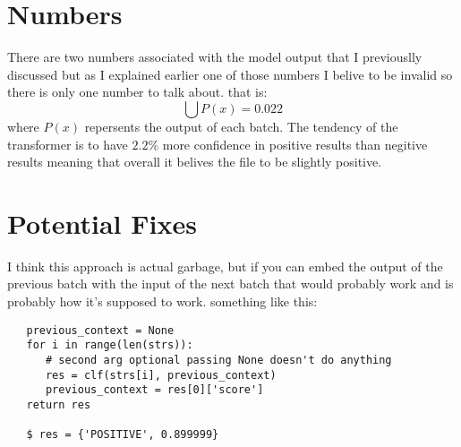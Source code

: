 \documentclass[12pt]{article}
\begin{document}
\newpage
\section{Numbers}
There are two numbers associated with the model output that I previouslly discussed but as I explained
earlier one of those numbers I belive to be invalid so there is only one number to talk about.
that is: $$ \bigcup{P(x)} = 0.022 $$ where $P(x)$ repersents the output of each batch.
The tendency of the transformer is to have $2.2\%$ more confidence in positive results
than negitive results
meaning that overall it belives the file to be slightly positive.

\section{Potential Fixes}
I think this approach is actual garbage, but if you can embed the output of the previous batch
with the input of the next batch that would probably work and is probably how it's supposed to work.
something like this:
\begin{verbatim}
   previous_context = None
   for i in range(len(strs)):
      # second arg optional passing None doesn't do anything
      res = clf(strs[i], previous_context) 
      previous_context = res[0]['score']
   return res

   $ res = {'POSITIVE', 0.899999}
\end{verbatim}

\newpage
{}

\end{document}
